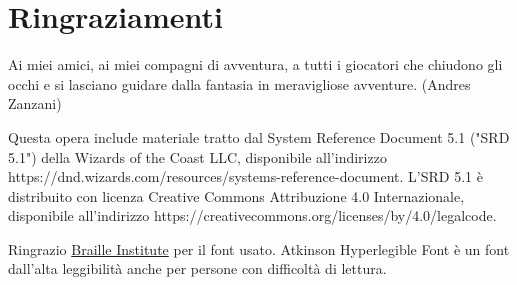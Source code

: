 \section{Ringraziamenti}

\begin{enfasi}{
			\begin{center}
Ai miei amici, ai miei compagni di avventura, a tutti i giocatori che chiudono gli occhi e si lasciano guidare dalla fantasia in meravigliose avventure. (Andres Zanzani)
			\end{center}
}\end{enfasi}

\medskip

Questa opera include materiale tratto dal System Reference Document 5.1 ("SRD 5.1") della Wizards of the Coast LLC, disponibile all'indirizzo https://dnd.wizards.com/resources/systems-reference-document. L'SRD 5.1 è distribuito con licenza Creative Commons Attribuzione 4.0 Internazionale, disponibile all'indirizzo https://creativecommons.org/licenses/by/4.0/legalcode.


\medskip


Ringrazio \href{https://www.brailleinstitute.org/freefont/}{Braille Institute} per il font usato. Atkinson Hyperlegible Font è un font dall'alta leggibilità anche per persone con difficoltà di lettura.


